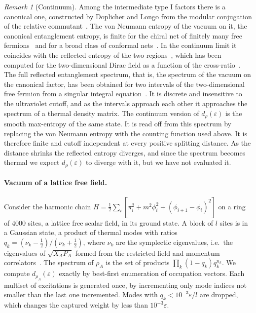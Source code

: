 \documentclass[11pt]{article}
\theoremstyle{definition}\newtheorem{definition}{Definition}[section]
\theoremstyle{remark}\newtheorem*{remark}{Remark}
\begin{document}
\begin{remark}[Continuum]
Among the intermediate type I factors there is a canonical one, constructed by Doplicher and Longo from the modular
conjugation of the relative commutant~\cite{DoplicherLongo}. The von Neumann entropy of the vacuum on it, the
canonical entanglement entropy, is finite for the chiral net of finitely many free fermions~\cite{LongoXu} and for a
broad class of conformal nets~\cite{PanebiancoWegener}. In the continuum limit it coincides with the reflected entropy
of the two regions~\cite{DuttaFaulkner}, which has been computed for the two-dimensional Dirac field as a function of the
cross-ratio~\cite{BuenoCasini}. The full reflected entanglement spectrum, that is, the spectrum of the vacuum on the
canonical factor, has been obtained for two intervals of the two-dimensional free fermion from a singular integral
equation~\cite{DuttaFaulknerLin}. It is discrete and insensitive to the ultraviolet cutoff, and as the intervals approach each other it
approaches the spectrum of a thermal density matrix. The continuum version of $d_{\rho}(\varepsilon)$ is the smooth max-entropy of the
same state. It is read off from this spectrum by replacing the von Neumann entropy with the counting function used
above. It is therefore finite and cutoff independent at every positive splitting distance. As the distance shrinks the
reflected entropy diverges, and since the spectrum becomes thermal we expect $d_{\rho}(\varepsilon)$ to diverge with it, but we have not
evaluated it.
\end{remark}

\paragraph{Vacuum of a lattice free field.} Consider the harmonic chain
$H=\tfrac12\sum_i[\pi_i^2+m^2\phi_i^2+(\phi_{i+1}-\phi_i)^2]$ on a ring of $4000$ sites, a lattice free scalar field, in its ground state. A
block of $l$ sites is in a Gaussian state, a product of thermal modes with ratios $q_k=(\nu_k-\tfrac12)/(\nu_k+\tfrac12)$, where $\nu_k$ are
the symplectic eigenvalues, i.e.\ the eigenvalues of $\sqrt{X_AP_A}$ formed from the restricted field and momentum
correlators~\cite{AudenaertEtAl}. The spectrum of $\rho_A$ is the set of products $\prod_k(1-q_k)q_k^{n_k}$. We compute $d_{\rho_A}(\varepsilon)$
exactly by best-first enumeration of occupation vectors. Each multiset of excitations is generated once, by
incrementing only mode indices not smaller than the last one incremented. Modes with $q_k<10^{-3}\varepsilon/l$ are dropped,
which changes the captured weight by less than $10^{-3}\varepsilon$.
\end{document}
